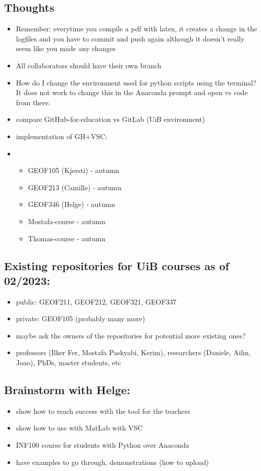 \documentclass{article}
\begin{document}
\subsection*{Thoughts}
    \begin{itemize}
        \item Remember: everytime you compile a pdf with latex, it creates a 
        change in the logfiles and you have to commit and push again although 
        it doesn't really seem like you made any changes
        \item All collaborators should have their own branch
        \item How do I change the environment used for python scripts using 
        the terminal? It does not work to change this in the Anaconda prompt 
        and open vs code from there.
        \item compare GitHub-for-education vs GitLab (UiB environment)
        \item implementation of GH+VSC:
        \item \begin{itemize}
            \item GEOF105 (Kjersti) - autumn
            \item GEOF213 (Camille) - autumn
            \item GEOF346 (Helge) - autumn
            \item Mostafa-course - autumn
            \item Thomas-course - autumn
            \end{itemize}
    \end{itemize}

    \subsection*{Existing repositories for UiB courses as of 02/2023:}
\begin{itemize}
    \item public: GEOF211, GEOF212, GEOF321, GEOF337
    \item private: GEOF105 (probably many more)
    \item maybe ask the owners of the repositories for potential more existing ones?
    \item professors (Ilker Fer, Mostafa Paskyabi, Kerim), researchers (Daniele, Ailin, Joao), PhDs, master students, etc
\end{itemize}

\subsection*{Brainstorm with Helge:}
\begin{itemize}
    \item show how to reach success with the tool for the teachers
    \item show how to use with MatLab with VSC
    \item INF100 course for students with Python over Anaconda
    \item have examples to go through, demonstrations (how to upload)
\end{itemize}
\end{document}
